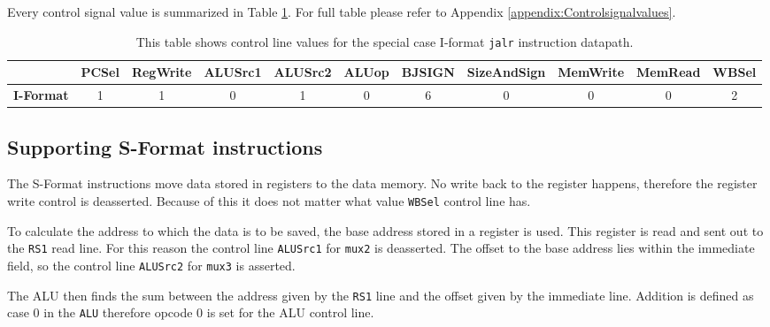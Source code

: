             Every control signal value is summarized in Table \ref{table:JALRFORMAT}. For full table please refer to Appendix \ref{appendix:Controlsignalvalues}.
            
            \begin{table}[h!]
                \small
                \hspace{-2.4cm}
                \begin{tabular}{|c||c|c|c|c|c|c|c|c|c|c|}
                	\hline
                	                  & \textbf{PCSel} & \textbf{RegWrite} & \textbf{ALUSrc1} & \textbf{ALUSrc2} & \textbf{ALUop} & \textbf{BJSIGN} & \textbf{SizeAndSign} & \textbf{MemWrite} & \textbf{MemRead} & \textbf{WBSel} \\ \hline\hline
                	\textbf{I-Format} &       1        &         1         &        0         &        1         &       0        &        6        &         0          &         0         &        0         &       2        \\ \hline
                \end{tabular}
                \caption{This table shows control line values for the special case I-format \texttt{jalr} instruction datapath. }
                \label{table:JALRFORMAT}
            \end{table}
        
    
    \subsection{Supporting S-Format instructions}
        The S-Format instructions move data stored in registers to the data memory. No write back to the register happens, therefore the register write control is deasserted. Because of this it does not matter what value \texttt{WBSel} control line has. 
        
        To calculate the address to which the data is to be saved, the base address stored in a register is used. This register is read and sent out to the \texttt{RS1} read line. For this reason the control line \texttt{ALUSrc1} for \texttt{mux2} is deasserted. The offset to the base address lies within the immediate field, so the control line \texttt{ALUSrc2} for \texttt{mux3} is asserted.
        
        The ALU then finds the sum between the address given by the \texttt{RS1} line and the offset given by the immediate line. Addition is defined as case 0 in the \texttt{ALU} therefore opcode 0 is set for the ALU control line.
        
